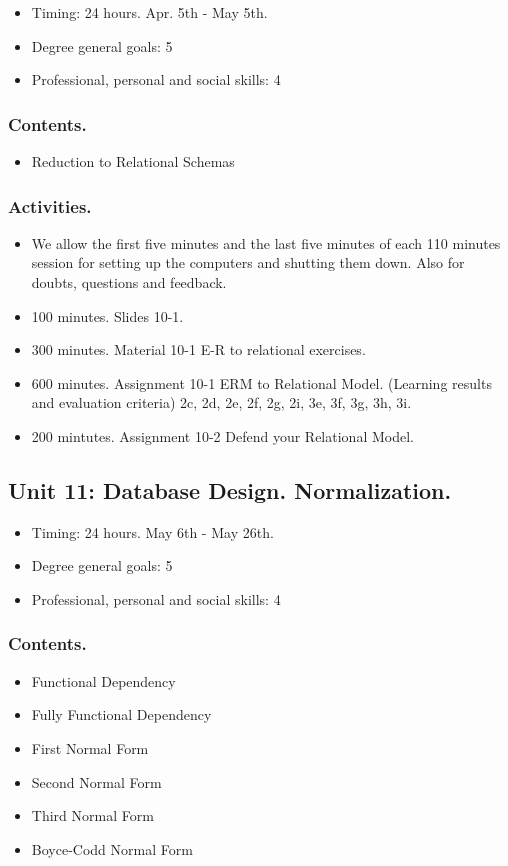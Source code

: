\documentclass[catalan, a4paper, 12pt, titlepage]{article}
\begin{document}
  \begin{itemize}
	\item Timing: 24 hours. Apr. 5th - May 5th.
	\item Degree general goals: 5
	\item Professional, personal and social skills: 4
  \end{itemize}

  \subsubsection{Contents.}
  \begin{itemize}
	\item Reduction to Relational Schemas
  \end{itemize}

  \subsubsection{Activities.}
  \begin{itemize}
          \item We allow the first five minutes and the last five minutes of each 110 minutes session for setting up the computers and shutting them down. Also for doubts, questions and feedback.
	  \item 100 minutes. Slides 10-1.
	  \item 300 minutes. Material 10-1 E-R to relational exercises.
	  \item 600 minutes. Assignment 10-1 ERM to Relational Model. (\faGraduationCap Learning results and evaluation criteria) 2c, 2d, 2e, 2f, 2g, 2i, 3e, 3f, 3g, 3h, 3i.
	  \item 200 mintutes. Assignment 10-2 Defend your Relational Model.
  \end{itemize}

  \subsection{Unit 11: Database Design. Normalization.}

  \begin{itemize}
	\item Timing: 24 hours. May 6th - May 26th.
	\item Degree general goals: 5
	\item Professional, personal and social skills: 4
  \end{itemize}

  \subsubsection{Contents.}
  \begin{itemize}
	\item Functional Dependency
	\item Fully Functional Dependency
	\item First Normal Form
	\item Second Normal Form
	\item Third Normal Form
	\item Boyce-Codd Normal Form
  \end{itemize}
\end{document}
